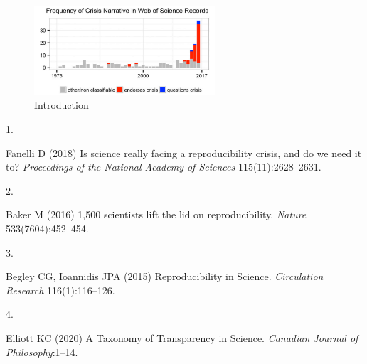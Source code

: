 \documentclass[9pt,twocolumn,twoside,]{pnas-new}
\newlength{\cslhangindent}
\newlength{\csllabelwidth}
\newlength{\cslentryspacingunit} %
\newenvironment{CSLReferences}[2] %
 {%
  \setlength{\parindent}{0pt}
  \ifodd #1
  \let\oldpar\par
  \def\par{\hangindent=\cslhangindent\oldpar}
  \fi
  \setlength{\parskip}{#2\cslentryspacingunit}
 }%
 {}
\newcommand{\CSLLeftMargin}[1]{\parbox[t]{\csllabelwidth}{#1}}
\newcommand{\CSLRightInline}[1]{\parbox[t]{\linewidth - \csllabelwidth}{#1}\break}
\begin{document}
\begin{figure}
\centering
\includegraphics[width=0.6\textwidth,height=0.4\textheight]{image intro .png}
\caption{Introduction}
\end{figure}

\showmatmethods
\showacknow
\pnasbreak

\hypertarget{refs}{}
\begin{CSLReferences}{0}{0}
\leavevmode{}%
\CSLLeftMargin{1. }
\CSLRightInline{Fanelli D (2018) Is science really facing a
reproducibility crisis, and do we need it to? \emph{Proceedings of the
National Academy of Sciences} 115(11):2628--2631.}

\leavevmode{}%
\CSLLeftMargin{2. }
\CSLRightInline{Baker M (2016) 1,500 scientists lift the lid on
reproducibility. \emph{Nature} 533(7604):452--454.}

\leavevmode{}%
\CSLLeftMargin{3. }
\CSLRightInline{Begley CG, Ioannidis JPA (2015) Reproducibility in
{Science}. \emph{Circulation Research} 116(1):116--126.}

\leavevmode{}%
\CSLLeftMargin{4. }
\CSLRightInline{Elliott KC (2020) A {Taxonomy} of {Transparency} in
{Science}. \emph{Canadian Journal of Philosophy}:1--14.}

\end{CSLReferences}



% 
\end{document}
